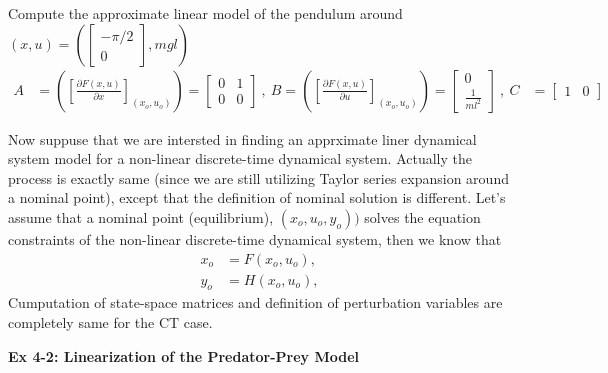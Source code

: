 \documentclass[twoside]{article}
\begin{document}
%
Compute the approximate linear model of the pendulum around $(x,u) =
\left( \left[ \begin{array}{c} -\pi/2 \\ 0 \end{array} \right] , m g l \right)$
%
\begin{align*}
A &= \left( \left[ \frac{\partial F(x,u)}{\partial x}
                      \right]_{(x_o,u_o)} \right) =
                    \left[ \begin{array}{cc} 0 & 1 \\ 0 & 0 \end{array}  \right]
\ , \ B = \left( \left[ \frac{\partial F(x,u)}{\partial u}
                      \right]_{(x_o,u_o)} \right) =
                                                            \left[ \begin{array}{c}
                                                                     0
                                                                     \\
                                                                     \frac{1}{m
                                                                     l^2}  \end{array}  \right]
\ , \
C &= \left[ \begin{array}{cc} 1 & 0 \end{array}  \right]
\end{align*}

Now suppuse that we are intersted in finding an apprximate liner
dynamical system model for a non-linear discrete-time dynamical
system. Actually the process is exactly same (since we are still
utilizing Taylor series expansion around a nominal point), except that 
the definition of nominal solution is different. Let's assume that 
a nominal point (equilibrium), $(x_o,u_o,y_o))$ solves the equation
constraints of the non-linear discrete-time dynamical system, then 
we know that
\begin{align*}
  x_o &= F(x_o,u_o) , \\
  y_o &= H(x_o,u_o) , 
\end{align*}
%
Cumputation of state-space matrices and definition of perturbation
variables are completely same for the CT case. 
%

\textbf{Ex 4-2: Linearization of the Predator-Prey Model}
\end{document}
